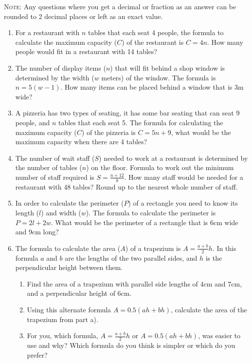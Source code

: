 \documentclass[a4paper,12pt]{article}
\begin{document}
\textsc{Note}: Any questions where you get a decimal or fraction 
as an answer can be rounded to 2 decimal places or left as 
an exact value.

\begin{enumerate}

\item For a restaurant with $n$ tables that each seat 4 people,
    the formula to calculate the maximum capacity ($C$) of the 
    restaurant is $C = 4n$. How many people would fit in a
    restaurant with 14 tables?

\item The number of display items ($n$) that will fit 
    behind a shop window is determined by the width ($w$ meters) 
    of the window. The formula is $n = 5(w - 1)$. How many items 
    can be placed behind a window that is 3m wide?

\item A pizzeria has two types of seating, it has some bar 
    seating that can seat 9 people, and $n$ tables that 
    each seat 5. The formula for calculating the maximum 
    capacity ($C$) of the pizzeria is $C = 5n + 9$, what
    would be the maximum capacity when there are 4 tables?

\item The number of wait staff ($S$) needed to work at a restaurant is 
    determined by the number of tables ($n$) on the floor. Formula 
    to work out the minimum number of staff required is 
    $S = \frac{n + 12}{8}$. How many staff would be needed for a 
    restaurant with 48 tables? Round up to the nearest whole number 
    of staff.

\item In order to calculate the perimeter ($P$) of a rectangle 
    you need to know its length ($l$) and width ($w$). The formula
    to calculate the perimeter is $P = 2l + 2w$. What would be
    the perimeter of a rectangle that is 6cm wide and 9cm long?

\item The formula to calculate the area ($A$) of a trapezium is
    $A = \frac{a + b}{2}h$. In this formula $a$ and 
    $b$ are the lengths of the two parallel sides, and $h$ is the 
    perpendicular height between them.
    \begin{enumerate}
    \item Find the area of a trapezium with parallel side lengths 
        of 4cm and 7cm, and a perpendicular height of 6cm.
    \item Using this alternate formula 
        $A = 0.5(ah + bh)$, calculate the 
        area of the trapezium from part a).
    \item For you, which formula, $A = \frac{a + b}{2}h$
        or $A = 0.5(ah + bh)$, was easier to use and why? Which 
        formula do you think is simpler or which do you prefer?
    \end{enumerate}


\end{enumerate}
\end{document}

